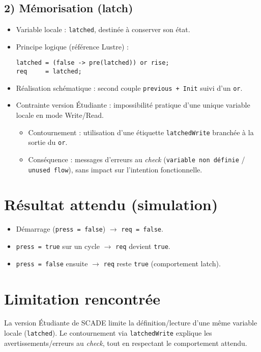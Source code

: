 \documentclass[11pt,a4paper]{report}
\begin{document}
\subsection*{2) Mémorisation (latch)}
\begin{itemize}
  \item Variable locale : \texttt{latched}, destinée à conserver son état.
  \item Principe logique (référence Lustre) :
\begin{lstlisting}
latched = (false -> pre(latched)) or rise;
req     = latched;
\end{lstlisting}
  \item Réalisation schématique : second couple \texttt{previous + Init} suivi d’un \texttt{or}.
  \item Contrainte version Étudiante : impossibilité pratique d’une unique variable locale en mode Write/Read.
        \begin{itemize}
          \item Contournement : utilisation d’une étiquette \texttt{latchedWrite} branchée à la sortie du \texttt{or}.
          \item Conséquence : messages d’erreurs au \textit{check} (\texttt{variable non définie} / \texttt{unused flow}), sans impact sur l’intention fonctionnelle.
        \end{itemize}
\end{itemize}

\section*{Résultat attendu (simulation)}
\begin{itemize}
  \item Démarrage (\texttt{press = false}) $\rightarrow$ \texttt{req = false}.
  \item \texttt{press = true} sur un cycle $\rightarrow$ \texttt{req} devient \texttt{true}.
  \item \texttt{press = false} ensuite $\rightarrow$ \texttt{req} reste \texttt{true} (comportement latch).
\end{itemize}

\section*{Limitation rencontrée}
La version Étudiante de SCADE limite la définition/lecture d’une même variable locale (\texttt{latched}).  
Le contournement via \texttt{latchedWrite} explique les avertissements/erreurs au \textit{check}, tout en respectant le comportement attendu.
\end{document}
